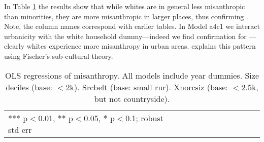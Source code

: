 \documentclass[11pt, letterpaper]{article}
\begin{document}
\begin{spacing}{1.4}
 
In Table \ref{regE} the results show that while whites are in general less misanthropic
than minorities, they are more misanthropic in larger places, thus confirming
\citet{wilson85}. Note, the column names correspond with earlier tables.  
 In Model a4c1 we interact urbanicity with the white household dummy---indeed we find confirmation for \citet{wilson85}---clearly whites experience more misanthropy in urban areas. \citet{wilson85} explains this
 pattern using Fischer's sub-cultural theory.

 \begin{spacing}{.67}
   \begin{table}[H]\centering
     \caption{OLS regressions  of misanthropy. All models include year
       dummies. Size deciles (base: $<$2k). Srcbelt (base: small rur). Xnorcsiz (base: $<$2.5k, but not countryside).} \label{regE}
     \begin{tiny} \begin{tabular}{p{1.2in}p{.45in}p{.45in}p{.45in}p{.45in}p{.45in}p{.45in}p{.45in}p{.45in}p{.45in}p{.45 in}}\hline
         
         \hline  *** p$<$0.01, ** p$<$0.05, * p$<$0.1; robust std err
       \end{tabular}\end{tiny}\end{table}
 \end{spacing}



 
\end{spacing}
\end{document}
